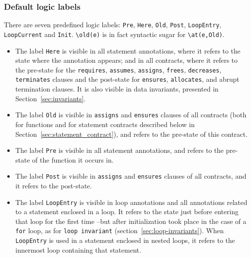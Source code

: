 \subsubsection*{Default logic labels}\label{sec:default-logic-labels}
There are seven predefined logic labels: \lstinline|Pre|, \lstinline|Here|,
\lstinline|Old|,
\lstinline|Post|, \lstinline|LoopEntry|, \lstinline|LoopCurrent|
and \lstinline|Init|.
\lstinline|\old(e)| is
in fact syntactic sugar for \lstinline|\at(e,Old)|.

\begin{itemize}

\item The label \lstinline|Here| is visible in all statement annotations,
  where it refers to the state where the annotation appears; and in
  all contracts, where it refers to the pre-state for the
  \lstinline|requires|, \lstinline|assumes|, \lstinline|assigns|,
  \lstinline|frees|,
  \lstinline|decreases|,
  \lstinline|terminates|
  clauses and the post-state for 
  \lstinline|ensures|, \lstinline|allocates|, and abrupt termination
  clauses.
It is also visible in data invariants, presented in Section~\ref{sec:invariants}.
\item The label \lstinline|Old| is visible in \lstinline|assigns| and
  \lstinline|ensures| clauses of all contracts (both for functions and for
  statement contracts described below in
  Section~\ref{sec:statement_contract}), and refers to the pre-state
  of this contract.
\item The label \lstinline|Pre| is visible in all statement annotations,
  and refers to the pre-state of the function it occurs in.
\item The label \lstinline|Post| is visible in
\lstinline|assigns| and \lstinline|ensures| clauses of all contracts,
and it refers to the post-state.

\item The label \lstinline|LoopEntry|
is visible in loop annotations and
all annotations related to a statement enclosed in a loop.
It refers to the state just before entering that loop
for the first time --but after initialization took place in the case of a 
\lstinline|for| loop, as for \lstinline|loop invariant| 
(section~\ref{sec:loop-invariants}). When \lstinline|LoopEntry| is used in a 
statement enclosed in nested loops, it
refers to the innermost loop containing that statement.


\end{itemize}
